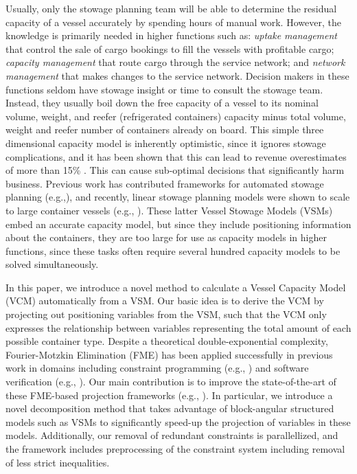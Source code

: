 \documentclass{llncs}
\begin{document}
Usually, only the stowage planning team will be able to determine the residual capacity of a vessel accurately by spending hours of manual work. 
However, the knowledge is primarily needed in higher functions such as: {\em uptake management} that control the sale of cargo bookings to fill the vessels with profitable cargo; {\em capacity management} that route cargo through the service network; and {\em network management} that makes changes to the service network. Decision makers in these functions seldom have stowage insight or time to consult the stowage team. Instead, they usually boil down the free capacity of a vessel to its nominal volume, weight, and reefer (refrigerated containers) capacity minus total volume, weight and reefer number of containers already on board. This simple three dimensional capacity model is inherently optimistic, since it ignores stowage complications, and it has been shown that this can lead to revenue overestimates of more than 15\% \cite{AlbertosThesis}. This can cause sub-optimal decisions that significantly harm business. 
%
Previous work has contributed frameworks for automated stowage planning (e.g.,\cite{roach00,kimkang02,ambrosino04,pacino11}), and recently, linear stowage planning models were shown to scale to large container vessels (e.g., \cite{AlbertosThesis}). These latter Vessel Stowage Models (VSMs) embed an accurate capacity model, but since they include positioning information about the containers, they are too large for use as capacity models in higher functions, since these tasks often require several hundred capacity models to be solved simultaneously.

In this paper, we introduce a novel method to calculate a Vessel Capacity Model (VCM) automatically from a VSM. Our basic idea is to derive the VCM by projecting out positioning variables from the VSM, such that the VCM only expresses the relationship between variables representing the total amount of each possible container type. Despite a theoretical double-exponential complexity, Fourier-Motzkin Elimination (FME) has been applied successfully in previous work in domains including constraint programming (e.g., \cite{lassez90}) and software verification (e.g., \cite{benoy05}). Our main contribution is to improve the state-of-the-art of these FME-based projection frameworks (e.g., \cite{simon05,lukatskii08,shapot12}). In particular, we introduce a novel decomposition method that takes advantage of block-angular structured models such as VSMs to significantly speed-up the projection of variables in these models. Additionally, our removal of redundant constraints is parallellized, and the framework includes preprocessing of the constraint system including removal of less strict inequalities.
\end{document}
